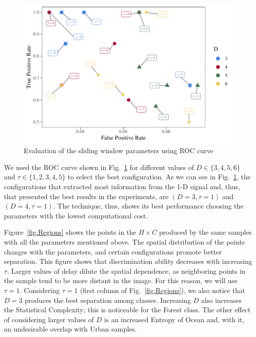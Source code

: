 \documentclass[journal]{IEEEtran}
\begin{document}
\begin{itemize}
	\begin{figure}[hbt]
		\includegraphics[width=\columnwidth]{Figures/ROC.pdf}
		\caption{Evaluation of the sliding window parameters using ROC curve}
		\label{fig:ROC}
	\end{figure} 
	
	We used the ROC curve shown in Fig.~\ref{fig:ROC} for different values of $D \in \{3, 4, 5, 6 \} $ and $\tau \in \{1, 2, 3, 4, 5 \}$ to select the best configuration.
	As we can see in Fig.~\ref{fig:ROC}, the configurations that extracted most information from the 1-D signal and, thus, that presented the best results in the experiments, are $(D = 3, \tau = 1)$ and $(D = 4, \tau = 1)$.
	The technique, thus, shows its best performance choosing the parameters with the lowest computational cost.
	
	Figure~\ref{fig:Regions} shows the points in the $H\times C$ produced by the same samples with all the parameters mentioned above.
	The spatial distribution of the points changes with the parameters,
	and certain configurations promote better separation.
	This figure shows that discrimination ability decreases with increasing $\tau$.
	Larger values of delay dilute the spatial dependence, as neighboring points in the sample tend to be more distant in the image.
	For this reason, we will use $\tau=1$.
	Considering $\tau=1$ (first column of Fig.~\ref{fig:Regions}), 
	we also notice that $D=3$ produces the best separation among classes.
	Increasing $D$ also increases the Statistical Complexity; this is noticeable for the Forest class.
	The other effect of considering larger values of $D$ is an increased Entropy of Ocean and, with it, an undesirable overlap with Urban samples.
	

\end{itemize}
\end{document}
